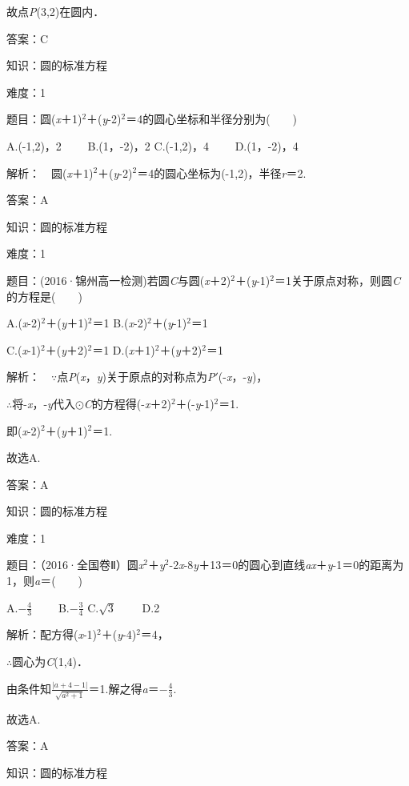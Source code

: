 \documentclass{article} %
\begin{document}
故点\textit{P}(3,2)在圆内．

答案：C

知识：圆的标准方程

难度：1

题目：圆(\textit{x}＋1)${}^{2}$＋(\textit{y}-2)${}^{2}$＝4的圆心坐标和半径分别为(　　)

A.(-1,2)，2　　 B.(1，-2)，2  C.(-1,2)，4　　 D.(1，-2)，4

解析：　圆(\textit{x}＋1)${}^{2}$＋(\textit{y}-2)${}^{2}$＝4的圆心坐标为(-1,2)，半径\textit{r}＝2.

答案：A

知识：圆的标准方程

难度：1

题目：(2016·锦州高一检测)若圆\textit{C}与圆(\textit{x}＋2)${}^{2}$＋(\textit{y}-1)${}^{2}$＝1关于原点对称，则圆\textit{C}的方程是(　　)

A.(\textit{x}-2)${}^{2}$＋(\textit{y}＋1)${}^{2}$＝1 B.(\textit{x}-2)${}^{2}$＋(\textit{y}-1)${}^{2}$＝1

C.(\textit{x}-1)${}^{2}$＋(\textit{y}＋2)${}^{2}$＝1 D.(\textit{x}＋1)${}^{2}$＋(\textit{y}＋2)${}^{2}$＝1

解析：　$\mathrm{\because}$点\textit{P}(\textit{x}，\textit{y})关于原点的对称点为\textit{P}$'$(-\textit{x}，-\textit{y})，

$\mathrm{\therefore}$将-\textit{x}，-\textit{y}代入$\mathrm{\odot}$\textit{C}的方程得(-\textit{x}＋2)${}^{2}$＋(-\textit{y}-1)${}^{2}$＝1.

即(\textit{x}-2)${}^{2}$＋(\textit{y}＋1)${}^{2}$＝1.

故选A.

答案：A

知识：圆的标准方程

难度：1

题目：（2016·全国卷Ⅱ）圆\textit{x}${}^{2}$＋\textit{y}${}^{2}$-2\textit{x}-8\textit{y}＋13＝0的圆心到直线\textit{ax}＋\textit{y}-1＝0的距离为1，则\textit{a}＝(　　)

A.$-\frac{4}{3}$　　 B.$-\frac{3}{4}$  C.$\sqrt{3}$　　 D.2

解析：配方得(\textit{x}-1)${}^{2}$＋(\textit{y}-4)${}^{2}$＝4，

$\mathrm{\therefore}$圆心为\textit{C}(1,4)．

由条件知$\frac{|a+4-1|}{\sqrt{a^2+1}}$＝1.解之得\textit{a}＝$-\frac{4}{3}$.

故选A.

答案：A

知识：圆的标准方程
\end{document}

